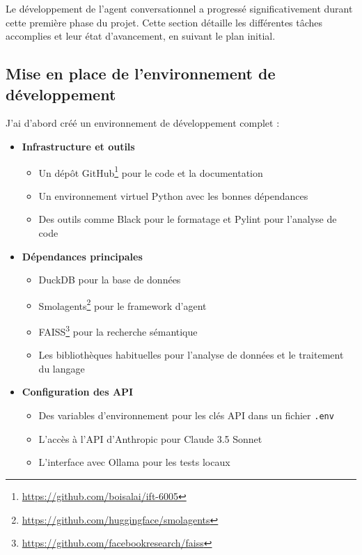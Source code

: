 \documentclass[a4paper,11pt]{article}
\begin{document}
Le développement de l'agent conversationnel a progressé significativement durant cette
première phase du projet. Cette section détaille les différentes tâches accomplies
et leur état d'avancement, en suivant le plan initial.

\subsection{Mise en place de l'environnement de développement}

J'ai d'abord créé un environnement de développement complet :

\begin{itemize}
    \item \textbf{Infrastructure et outils}
    \begin{itemize}
        \item Un dépôt GitHub\footnote{\url{https://github.com/boisalai/ift-6005}} pour le code et la documentation
        \item Un environnement virtuel Python avec les bonnes dépendances
        \item Des outils comme Black pour le formatage et Pylint pour l'analyse de code
    \end{itemize}
    \item \textbf{Dépendances principales}
    \begin{itemize}
        \item DuckDB pour la base de données
        \item Smolagents\footnote{\url{https://github.com/huggingface/smolagents}} pour le framework d'agent
        \item FAISS\footnote{\url{https://github.com/facebookresearch/faiss}} pour la recherche sémantique
        \item Les bibliothèques habituelles pour l'analyse de données et le traitement du langage
    \end{itemize}
    \item \textbf{Configuration des API}
    \begin{itemize}
        \item Des variables d'environnement pour les clés API dans un fichier \texttt{.env}
        \item L'accès à l'API d'Anthropic pour Claude 3.5 Sonnet
        \item L'interface avec Ollama pour les tests locaux
    \end{itemize}
\end{itemize}
\end{document}
